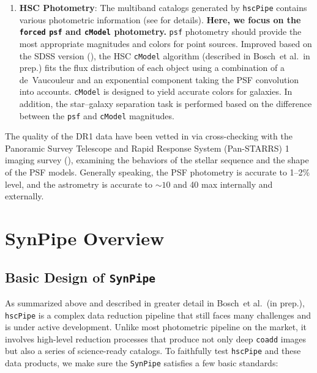 \documentclass[useamsfonts]{pasj01}
\def\etal{{\ et al.~}}
\def\hscpipe{\texttt{hscPipe}}
\def\synpipe{\texttt{SynPipe}}
\def\cmodel{\texttt{cModel}}
\def\forced{\texttt{forced}}
\begin{document}
\begin{enumerate}
        \item \textbf{HSC Photometry}: 
            The multiband catalogs generated by \hscpipe{} contains various photometric 
            information (see \citealt{HSCDR1} for details). 
            \textbf{Here, we focus on the \forced{} \texttt{psf} and \cmodel{} 
            photometry.}
            \texttt{psf} photometry should provide the most appropriate magnitudes and
            colors for point sources.
            Improved based on the SDSS version (\citealt{Lupton2001, Abazajian2004}), 
            the HSC \cmodel{}{} algorithm (described in Bosch\etal in prep.) fits the 
            flux distribution of each object using a combination of a de~Vaucouleur 
            and an exponential component taking the PSF convolution into accounts.
            \cmodel{} is designed to yield accurate colors for galaxies. 
            In addition, the star--galaxy separation task is performed based on the 
            difference between the \texttt{psf} and \cmodel{}{} magnitudes. 
            
    \end{enumerate}
    
    The quality of the DR1 data have been vetted in \citet{HSCDR1} via cross-checking 
    with the Panoramic Survey Telescope and Rapid Response System (Pan-STARRS) 1 
    imaging survey (\citealt{Schlafly2012, Tonry2012, Magnier2013}), examining the 
    behaviors of the stellar sequence and the shape of the PSF models. 
    Generally speaking, the PSF photometry is accurate to 1--2\% level, and the 
    astrometry is accurate to ${\sim}10$ and 40 max internally and externally. 
    

\section{SynPipe Overview}
    \label{sec:synpipe}
    
\subsection{Basic Design of \synpipe{}}
    \label{ssec:design}
    
    As summarized above and described in greater detail in Bosch\etal (in prep.),
    \hscpipe{} is a complex data reduction pipeline that still faces many challenges 
    and is under active development.
    Unlike most photometric pipeline on the market, it involves high-level reduction 
    processes that produce not only deep \texttt{coadd} images but also a series of 
    science-ready catalogs. 
    To faithfully test \hscpipe{} and these data products, we make sure the 
    \synpipe{} satisfies a few basic standards: 
    
\end{document}
